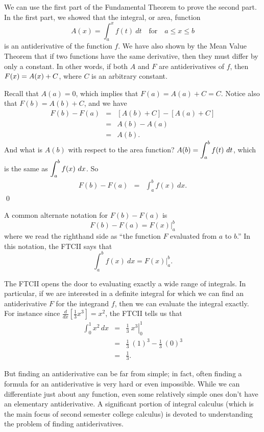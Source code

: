 \proof We can use the first part of the Fundamental Theorem to prove the second part.  In the first part, we showed that the integral, or area, function 
\[ A(x) = \int_a^x f(t) \ dt \quad \mbox{for} \quad a \leq x \leq b \]
is an antiderivative of the function $f$.  We have also shown by the Mean Value Theorem that if two functions have the same derivative, then they must differ by only a constant.  In other words, if both $A$ and $F$ are antiderivatives of $f$, then $\displaystyle F(x) = A(x) + C$, where $C$ is an arbitrary constant.

Recall that $A(a) = 0$, which implies that $F(a) = A(a) + C = C$.  Notice also that $F(b) = A(b) + C$, and we have
\begin{eqnarray*}
F(b) - F(a) & = & [A(b) + C] - [A(a) + C] \\
& = & A(b) - A(a) \\
& = & A(b).
\end{eqnarray*}
And what is $A(b)$ with respect to the area function?  $\displaystyle A(b) = \int_a^b f(t) \ dt$, which is the same as $\displaystyle \int_a^b f(x) \ dx$. So
\begin{eqnarray*}
F(b) - F(a) & = & \int_a^b f(x) \ dx.
\end{eqnarray*}
\qed

A common alternate notation for $F(b) - F(a)$ is 
\[ F(b) - F(a) = F(x) \Big|_a^b \]
where we read the righthand side as ``the function $F$ evaluated from $a$ to $b$.''  In this notation, the FTCII says that
\[ \int_a^b f(x) \ dx = F(x) \Big|_a^b. \]

The FTCII opens the door to evaluating exactly a wide range of integrals.  In particular, if we are interested in a definite integral for which we can find an antiderivative $F$ for the integrand $f$, then we can evaluate the integral exactly.  For instance since $\frac{d}{dx}[\frac{1}{3}x^3] = x^2$, the FTCII tells us that
\begin{eqnarray*}
\int_0^1 x^2 \, dx & = & \left. \frac{1}{3} \ x^3 \right|_0^1 \\
& = & \frac{1}{3} \ (1)^3 - \frac{1}{3} \ (0)^3 \\
& = & \frac{1}{3}.
\end{eqnarray*}

\vspace*{-.25cm}



But finding an antiderivative can be far from simple; in fact, often finding a formula for an antiderivative is very hard or even impossible.  While we can differentiate just about any function, even some relatively simple ones don't have an elementary antiderivative.  A significant portion of integral calculus (which is the main focus of second semester college calculus) is devoted to understanding the problem of finding antiderivatives.

